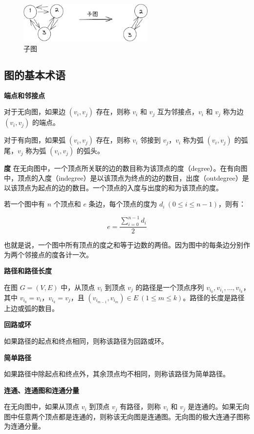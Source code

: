 \documentclass[lang=cn,newtx,10pt,scheme=chinese]{elegantbook}
\begin{document}
\begin{figure}[h!]
  \centering
  \includegraphics[width=0.6\textwidth]{./figure/pdf/cropped/subGraph.pdf}
  \caption{子图}
  \label{fig:subGraph}
\end{figure}

      


\subsection{图的基本术语}


\textbf{端点和邻接点}

对于无向图，如果边 $(v_i, v_j)$ 存在，则称 $v_i$ 和 $v_j$ 互为邻接点，$v_i$ 和 $v_j$ 称为边 $(v_i, v_j)$ 的端点。

对于有向图，如果弧 $(v_i, v_j)$ 存在，则称 $v_i$ 邻接到 $v_j$，$v_i$ 称为弧 $(v_i, v_j)$ 的弧尾，$v_j$ 称为弧 $(v_i, v_j)$ 的弧头。

\textbf{度}
在无向图中，一个顶点所关联的边的数目称为该顶点的度（degree）。在有向图中，顶点的入度（indegree）是以该顶点为终点的边的数目，出度（outdegree）是以该顶点为起点的边的数目。一个顶点的入度与出度的和为该顶点的度。

若一个图中有 $n$ 个顶点和 $e$ 条边，每个顶点的度为 $d_i \ (0 \leq i \leq n-1)$，则有：

\[
e = \frac{\sum_{i=0}^{n-1} d_i}{2}
\]

也就是说，一个图中所有顶点的度之和等于边数的两倍。因为图中的每条边分别作为两个邻接点的度各计一次。

\textbf{路径和路径长度}

在图 $G = (V, E)$ 中，从顶点 $v_i$ 到顶点 $v_j$ 的路径是一个顶点序列 $v_{i_0}, v_{i_1}, \dots, v_{i_k}$，其中 $v_{i_0} = v_i$，$v_{i_k} = v_j$，且 $(v_{i_{m-1}}, v_{i_m}) \in E \ (1 \leq m \leq k)$。路径的长度是路径上边或弧的数目。

\textbf{回路或环}

如果路径的起点和终点相同，则称该路径为回路或环。

\textbf{简单路径}

如果路径中除起点和终点外，其余顶点均不相同，则称该路径为简单路径。

\textbf{连通、连通图和连通分量}

在无向图中，如果从顶点 $v_i$ 到顶点 $v_j$ 有路径，则称 $v_i$ 和 $v_j$ 是连通的。如果无向图中任意两个顶点都是连通的，则称该无向图是连通图。无向图的极大连通子图称为连通分量。
\end{document}
